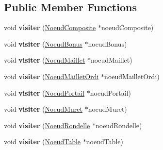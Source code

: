 \subsection*{Public Member Functions}
\begin{DoxyCompactItemize}
\item 
void {\bfseries visiter} (\hyperlink{class_noeud_composite}{Noeud\+Composite} $\ast$noeud\+Composite)\hypertarget{class_visiteur_duplication_aadb041ed4038b925fd9ee7dff7ddbf3c}{}\label{class_visiteur_duplication_aadb041ed4038b925fd9ee7dff7ddbf3c}

\item 
void {\bfseries visiter} (\hyperlink{class_noeud_bonus}{Noeud\+Bonus} $\ast$noeud\+Bonus)\hypertarget{class_visiteur_duplication_aba02ebe337ac2e429004b45b7badbc04}{}\label{class_visiteur_duplication_aba02ebe337ac2e429004b45b7badbc04}

\item 
void {\bfseries visiter} (\hyperlink{class_noeud_maillet}{Noeud\+Maillet} $\ast$noeud\+Maillet)\hypertarget{class_visiteur_duplication_a343da6b4a27c99808786a7e3b606d4ec}{}\label{class_visiteur_duplication_a343da6b4a27c99808786a7e3b606d4ec}

\item 
void {\bfseries visiter} (\hyperlink{class_noeud_maillet_ordi}{Noeud\+Maillet\+Ordi} $\ast$noeud\+Maillet\+Ordi)\hypertarget{class_visiteur_duplication_a09973352bdcdaaa23fb042a9d6424d63}{}\label{class_visiteur_duplication_a09973352bdcdaaa23fb042a9d6424d63}

\item 
void {\bfseries visiter} (\hyperlink{class_noeud_portail}{Noeud\+Portail} $\ast$noeud\+Portail)\hypertarget{class_visiteur_duplication_ab1bd60956c3cd4a32cefef61bee333db}{}\label{class_visiteur_duplication_ab1bd60956c3cd4a32cefef61bee333db}

\item 
void {\bfseries visiter} (\hyperlink{class_noeud_muret}{Noeud\+Muret} $\ast$noeud\+Muret)\hypertarget{class_visiteur_duplication_a8dbf3541d57af468b8b7972a4fc803ec}{}\label{class_visiteur_duplication_a8dbf3541d57af468b8b7972a4fc803ec}

\item 
void {\bfseries visiter} (\hyperlink{class_noeud_rondelle}{Noeud\+Rondelle} $\ast$noeud\+Rondelle)\hypertarget{class_visiteur_duplication_ab3150e9db9d174bfc665c2ddad62b20d}{}\label{class_visiteur_duplication_ab3150e9db9d174bfc665c2ddad62b20d}

\item 
void {\bfseries visiter} (\hyperlink{class_noeud_table}{Noeud\+Table} $\ast$noeud\+Table)\hypertarget{class_visiteur_duplication_a2d7897c04350eae38fd6f95a5332e1da}{}\label{class_visiteur_duplication_a2d7897c04350eae38fd6f95a5332e1da}


\end{DoxyCompactItemize}
